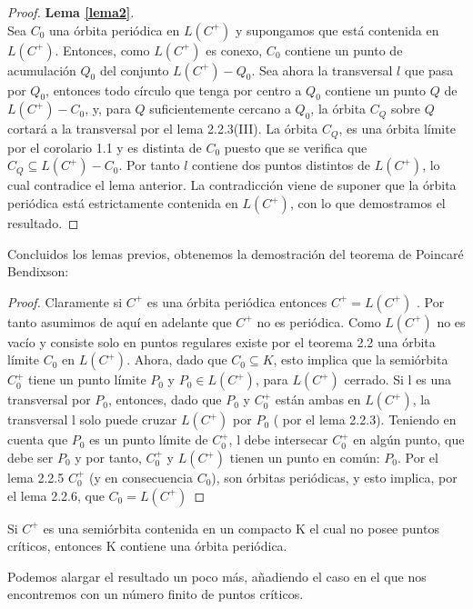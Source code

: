  \begin{proof}\textbf{Lema \ref{lema2}}.\\
 	Sea $C_0$ una órbita periódica en $L(C^+)$ y supongamos que está contenida en $L(C^+)$. Entonces, como $L(C^+)$ es conexo, $C_0$ contiene un punto de acumulación $Q_0$ del conjunto $L(C^+)-Q_0$. Sea ahora la transversal $l$ que pasa por $Q_0$, entonces todo círculo que tenga por centro a $Q_0$ contiene un punto $Q$ de $L(C^+)-C_0$, y, para $Q$ suficientemente cercano a $Q_0$, la órbita $C_Q$ sobre $Q$ cortará a la transversal por el lema 2.2.3(III). La órbita $C_Q$, es una órbita límite por el corolario 1.1 y es distinta de $C_0$ puesto que se verifica que $C_Q\subseteq L(C^+)-C_0$. Por tanto $l$ contiene dos puntos distintos de $L(C^+)$, lo cual contradice el lema anterior. La contradicción viene de suponer que la órbita periódica está estrictamente contenida en $L(C^+)$, con lo que demostramos el resultado.
 \end{proof}
 Concluidos los lemas previos, obtenemos la demostración del teorema de Poincaré Bendixson:
 \begin{proof}
 	Claramente si $C^+$  es una órbita periódica entonces $C^+=L(C^+)$ . Por tanto asumimos de aquí en adelante que $C^+$  no es periódica. Como $L(C^+)$ no es vacío  y consiste solo en puntos regulares existe por el teorema 2.2 una órbita límite $C_0$ en $L(C^+)$. Ahora, dado que $C_0\subseteq K$, esto implica que la semiórbita $C_0^+$ tiene un punto límite $P_0$ y $P_0 \in L(C^+)$, para $L(C^+)$ cerrado. Si l es una transversal por $P_0$, entonces, dado que $P_0$ y $C_0^+$ están ambas en $L(C^+)$, la transversal l solo puede cruzar $L(C^+)$ por $P_0$ ( por el lema 2.2.3). Teniendo en cuenta que $P_0$ es un punto límite de $C_0^+$, l debe intersecar $C_0^+$ en algún punto, que debe ser $P_0$ y por tanto, $C_0^+$ y $L(C^+)$ tienen un punto en común: $P_0$. Por el lema 2.2.5 $C_0^+$ (y en consecuencia $C_0$), son órbitas periódicas, y esto implica, por el lema 2.2.6, que $C_0=L(C^+)$
 \end{proof}
 
 \begin{corollary}
 	Si $C^+$ es una semiórbita contenida en un compacto K el cual no posee puntos críticos, entonces K contiene una órbita periódica.
 \end{corollary}
 
 
 Podemos alargar el resultado un poco más, añadiendo el caso en el que nos encontremos con un número finito de puntos críticos.
 
